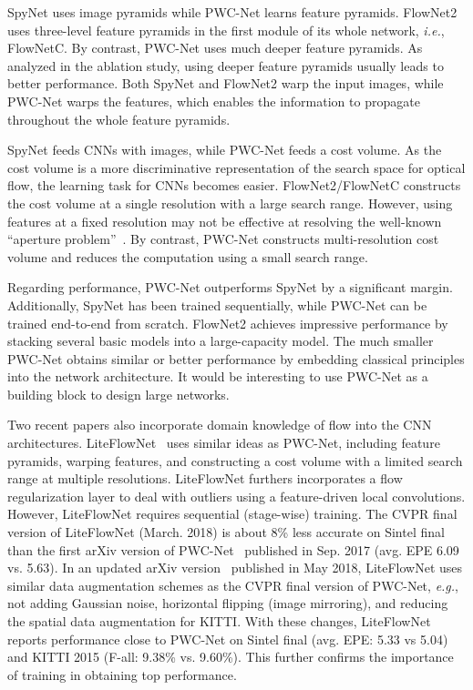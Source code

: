 \documentclass[10pt,journal,cspaper,compsoc]{IEEEtran}
\def\eg{\emph{e.g.}\xspace} \def\Eg{\emph{E.g.}\xspace}
\def\ie{\emph{i.e.}\xspace} \def\Ie{\emph{I.e.}\xspace}
\begin{document}
	SpyNet uses image pyramids while PWC-Net learns feature pyramids. FlowNet2 uses three-level feature pyramids in the first module of its whole network, \ie, FlowNetC. By contrast, PWC-Net uses much deeper feature pyramids. As analyzed in the ablation study, using deeper feature pyramids usually leads to better performance. Both SpyNet and FlowNet2 warp the input images, while PWC-Net warps the features, which enables the information to propagate throughout the whole feature pyramids. 
	
	SpyNet feeds CNNs with images, while PWC-Net feeds a cost volume. As the cost volume is a more discriminative representation of the search space for optical flow, the learning task for CNNs becomes easier. FlowNet2/FlowNetC constructs the cost volume at a single resolution with a large search range. However, using features at a fixed resolution may not be effective at resolving the well-known ``aperture problem''~\cite{adelson1982phenomenal,Horn:1981:DO,Lucas:1981:LK,weiss2002motion}. By contrast, PWC-Net constructs multi-resolution cost volume and reduces the computation using a small search range.
	
	Regarding performance, PWC-Net outperforms SpyNet by a significant margin. Additionally, SpyNet has been trained sequentially, while PWC-Net can be trained end-to-end from scratch.	FlowNet2 achieves impressive performance by stacking several basic models into a large-capacity model. 
	The much smaller PWC-Net obtains similar or better performance by embedding classical principles into the network architecture. 
	It would be interesting to use PWC-Net as a building block to design large networks.
	
	Two recent papers also incorporate domain knowledge of flow into the CNN architectures. LiteFlowNet~\cite{Hui_2018_CVPR} uses similar ideas as PWC-Net, including feature pyramids, warping features, and constructing a cost volume with a limited search range at multiple resolutions. LiteFlowNet furthers incorporates a flow regularization layer to deal with outliers using a feature-driven local convolutions. However, LiteFlowNet requires sequential (stage-wise) training. 
	The CVPR final version of LiteFlowNet  (March. 2018) is about 8\% less accurate on Sintel final than the first arXiv version of PWC-Net~\cite{Sun2017pwc} published in Sep. 2017 (avg. EPE 6.09 vs. 5.63).  In an updated arXiv version~\cite{Hui_2018_arXiv} published in May 2018, LiteFlowNet uses similar data augmentation schemes as the CVPR final version of PWC-Net, \eg, not adding Gaussian noise, horizontal flipping (image mirroring), and reducing the spatial data augmentation for KITTI.  With these changes, LiteFlowNet reports performance close to PWC-Net on Sintel final (avg. EPE: 5.33 vs 5.04) and KITTI 2015 (F-all: 9.38\% vs. 9.60\%). This further confirms the importance of  training in obtaining top performance. 
\end{document}

